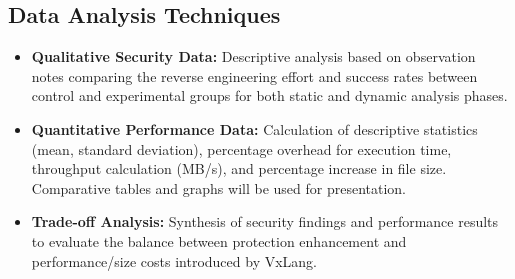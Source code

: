 \subsection{Data Analysis Techniques}
\begin{itemize}
    \item \textbf{Qualitative Security Data:} Descriptive analysis based on observation notes comparing the reverse engineering effort and success rates between control and experimental groups for both static and dynamic analysis phases.
    \item \textbf{Quantitative Performance Data:} Calculation of descriptive statistics (mean, standard deviation), percentage overhead for execution time, throughput calculation (MB/s), and percentage increase in file size. Comparative tables and graphs will be used for presentation.
    \item \textbf{Trade-off Analysis:} Synthesis of security findings and performance results to evaluate the balance between protection enhancement and performance/size costs introduced by VxLang.
\end{itemize}

